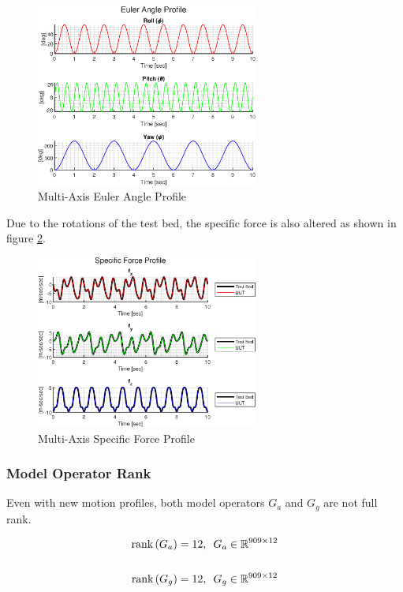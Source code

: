 \begin{figure}[h] 
	\centering
	\includegraphics[width=0.65\textwidth]{./images/MAM_euler_angle_profile.eps}
	\caption{Multi-Axis Euler Angle Profile}
	\label{fig: multi-axis euler angle profile}
\end{figure}
\FloatBarrier

Due to the rotations of the test bed, the specific force is also altered as shown in figure \ref{fig: multi-axis specific force profile}.

\begin{figure}[h] 
	\centering
	\includegraphics[width=0.65\textwidth]{./images/MAM_specific_force_profile.eps}
	\caption{Multi-Axis Specific Force Profile}
	\label{fig: multi-axis specific force profile}
\end{figure}
\FloatBarrier

\subsubsection{Model Operator Rank}

Even with new motion profiles, both model operators $G_a$ and $G_g$ are not full rank. 

\begin{align}
	\textrm{rank}\left(G_a\right) &= 12,\,\,\, G_a \in \mathbb{R}^{909 \times 12} \notag\\
	\\
	\textrm{rank}\left(G_g\right) &= 12,\,\,\, G_g \in \mathbb{R}^{909 \times 12} \notag
\end{align}

